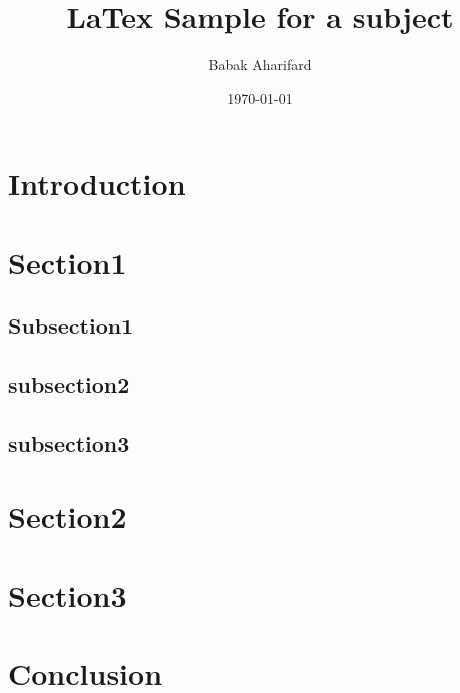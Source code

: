 \documentclass[a4paper,12pt]{article}
\begin{document}
\title{LaTex Sample for a subject}
\author{Babak Aharifard}
\date{\today}
\maketitle

\tableofcontents %

\newpage

\section{Introduction}

\section{Section1}

\subsection{Subsection1}

\subsection{subsection2}

\subsection{subsection3}


\section{Section2}

\section{Section3}

\section{Conclusion}
\end{document}
